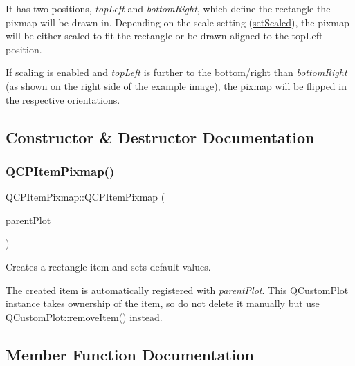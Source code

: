  It has two positions, {\itshape top\+Left} and {\itshape bottom\+Right}, which define the rectangle the pixmap will be drawn in. Depending on the scale setting (\hyperlink{class_q_c_p_item_pixmap_ab4d44529a1c6c8d37d0ea7560e042777}{set\+Scaled}), the pixmap will be either scaled to fit the rectangle or be drawn aligned to the top\+Left position.

If scaling is enabled and {\itshape top\+Left} is further to the bottom/right than {\itshape bottom\+Right} (as shown on the right side of the example image), the pixmap will be flipped in the respective orientations. 

\subsection{Constructor \& Destructor Documentation}
\mbox{\label{class_q_c_p_item_pixmap_aa6de42a37261b21a5480e7da122345c3}} 
\subsubsection{\texorpdfstring{Q\+C\+P\+Item\+Pixmap()}{QCPItemPixmap()}}
{\footnotesize\ttfamily Q\+C\+P\+Item\+Pixmap\+::\+Q\+C\+P\+Item\+Pixmap (\begin{DoxyParamCaption}\item[{\hyperlink{class_q_custom_plot}{Q\+Custom\+Plot} $\ast$}]{parent\+Plot }\end{DoxyParamCaption})\hspace{0.3cm}{\ttfamily [explicit]}}

Creates a rectangle item and sets default values.

The created item is automatically registered with {\itshape parent\+Plot}. This \hyperlink{class_q_custom_plot}{Q\+Custom\+Plot} instance takes ownership of the item, so do not delete it manually but use \hyperlink{class_q_custom_plot_ae04446557292551e8fb6e2c106e1848d}{Q\+Custom\+Plot\+::remove\+Item()} instead. 

\subsection{Member Function Documentation}
\mbox{\label{class_q_c_p_item_pixmap_a65d1ede7bb479b90d40186d083071947}} 
